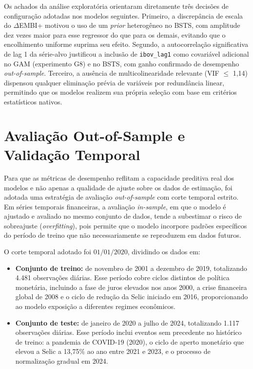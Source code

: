 \documentclass[	12pt, Times, openright, oneside, a4paper, english, brazil]{abntex2}
\begin{document}
Os achados da análise exploratória orientaram diretamente três decisões de configuração adotadas nos modelos seguintes. Primeiro, a discrepância de escala do $\Delta$EMBI+ motivou o uso de um \textit{prior} heterogêneo no BSTS, com amplitude dez vezes maior para esse regressor do que para os demais, evitando que o encolhimento uniforme suprima seu efeito. Segundo, a autocorrelação significativa de lag 1 da série-alvo justificou a inclusão de \texttt{ibov\_lag1} como covariável adicional no GAM (experimento G8) e no BSTS, com ganho confirmado de desempenho \textit{out-of-sample}. Terceiro, a ausência de multicolinearidade relevante (VIF $\leq$ 1,14) dispensou qualquer eliminação prévia de variáveis por redundância linear, permitindo que os modelos realizem sua própria seleção com base em critérios estatísticos nativos.

\section{Avaliação Out-of-Sample e Validação Temporal}

Para que as métricas de desempenho reflitam a capacidade preditiva real dos modelos e não apenas a qualidade de ajuste sobre os dados de estimação, foi adotada uma estratégia de avaliação \textit{out-of-sample} com corte temporal estrito. Em séries temporais financeiras, a avaliação \textit{in-sample}, em que o modelo é ajustado e avaliado no mesmo conjunto de dados, tende a subestimar o risco de sobreajuste (\textit{overfitting}), pois permite que o modelo incorpore padrões específicos do período de treino que não necessariamente se reproduzem em dados futuros.

O corte temporal adotado foi $\text{01/01/2020}$, dividindo os dados em:

\begin{itemize}
\item \textbf{Conjunto de treino:} de novembro de 2001 a dezembro de 2019, totalizando 4.481 observações diárias. Esse período cobre ciclos distintos de política monetária, incluindo a fase de juros elevados nos anos 2000, a crise financeira global de 2008 e o ciclo de redução da Selic iniciado em 2016, proporcionando ao modelo exposição a diferentes regimes econômicos.
\item \textbf{Conjunto de teste:} de janeiro de 2020 a julho de 2024, totalizando 1.117 observações diárias. Esse período inclui eventos sem precedente no histórico de treino: a pandemia de COVID-19 (2020), o ciclo de aperto monetário que elevou a Selic a 13,75\% ao ano entre 2021 e 2023, e o processo de normalização gradual em 2024.
\end{itemize}
\end{document}
